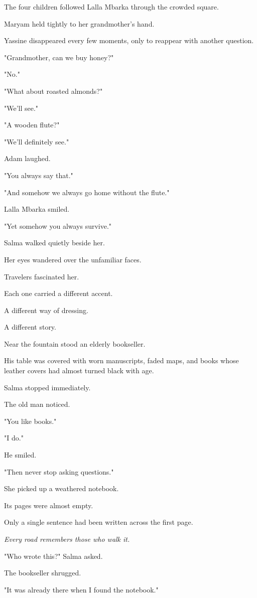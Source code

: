 \documentclass[12pt,openany]{book}
\begin{document}
The four children followed Lalla Mbarka through the crowded square.

Maryam held tightly to her grandmother's hand.

Yassine disappeared every few moments, only to reappear with another question.

"Grandmother, can we buy honey?"

"No."

"What about roasted almonds?"

"We'll see."

"A wooden flute?"

"We'll definitely see."

Adam laughed.

"You always say that."

"And somehow we always go home without the flute."

Lalla Mbarka smiled.

"Yet somehow you always survive."

Salma walked quietly beside her.

Her eyes wandered over the unfamiliar faces.

Travelers fascinated her.

Each one carried a different accent.

A different way of dressing.

A different story.

Near the fountain stood an elderly bookseller.

His table was covered with worn manuscripts, faded maps, and books whose leather covers had almost turned black with age.

Salma stopped immediately.

The old man noticed.

"You like books."

"I do."

He smiled.

"Then never stop asking questions."

She picked up a weathered notebook.

Its pages were almost empty.

Only a single sentence had been written across the first page.

\emph{Every road remembers those who walk it.}

"Who wrote this?" Salma asked.

The bookseller shrugged.

"It was already there when I found the notebook."
\end{document}
